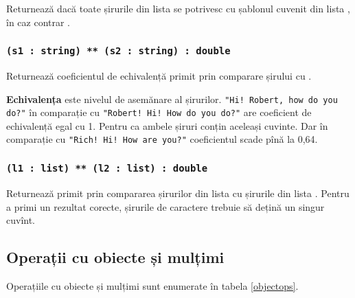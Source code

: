 Returnează \true{} dacă toate șirurile din lista  se potrivesc cu șablonul cuvenit din lista , în caz contrar \false{}.

\subsubsection{\lstinline|(s1 : string) ** (s2 : string) : double|}

Returnează coeficientul de echivalență primit prin comparare șirului  cu .

{\bf Echivalența} este nivelul de asemănare al șirurilor. \lstinline|"Hi! Robert, how do you do?"| în comparație cu \lstinline|"Robert! Hi! How do you do?"| are coeficient de echivalență egal cu 1. Pentru ca ambele șiruri conțin aceleași cuvinte. Dar în comparație cu  \lstinline|"Rich! Hi! How are you?"| coeficientul scade pînă la 0,64.

\subsubsection{\lstinline|(l1 : list) ** (l2 : list) : double|}

Returnează primit prin compararea șirurilor din lista  cu șirurile din lista .
Pentru a primi un rezultat corecte, șirurile de caractere trebuie să dețină un singur cuvînt.

\subsection{Operații cu obiecte și mulțimi}

Operațiile cu obiecte și mulțimi sunt enumerate în tabela \ref{objectops}.

